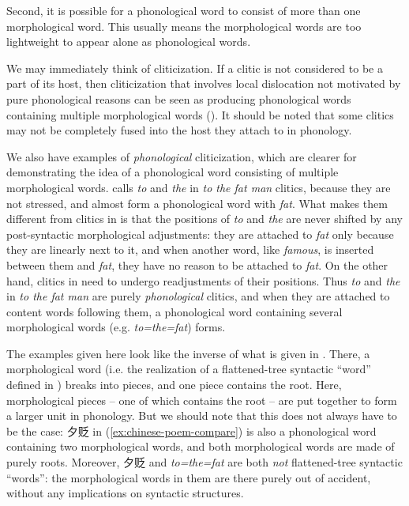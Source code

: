 \documentclass[a4paper, oneside, scheme=plain, 12pt]{article}
\newcommand*{\citepage}[1]{p.~{#1}}
\newcommand{\form}[1]{\emph{#1}}
\begin{document}
Second, it is possible for a phonological word to consist of more than one morphological word.
This usually means the morphological words are too lightweight
to appear alone as phonological words.

We may immediately think of cliticization.
If a clitic is not considered to be a part of its host,
then cliticization that involves local dislocation not motivated by pure phonological reasons
can be seen as producing phonological words containing multiple morphological words
().
It should be noted that some clitics may not be completely fused into the host they attach to in phonology.

We also have examples of \emph{phonological} cliticization,
which are clearer for demonstrating the idea of a phonological word consisting of multiple morphological words.
\citet[\citepage{49}]{dixon2009basic1} calls \form{to} and \form{the} in \form{to the fat man} clitics,
because they are not stressed, and almost form a phonological word with \form{fat}.
What makes them different from clitics in 
is that the positions of \form{to} and \form{the} are never shifted by any post-syntactic morphological adjustments:
they are attached to \form{fat} only because they are linearly next to it,
and when another word, like \form{famous}, is inserted between them and \form{fat},
they have no reason to be attached to \form{fat}.
On the other hand, clitics in  need to undergo readjustments of their positions.
Thus \form{to} and \form{the} in \form{to the fat man} are purely \emph{phonological} clitics,
and when they are attached to content words following them,
a phonological word containing several morphological words (e.g. \form{to=the=fat}) forms.

The examples given here look like the inverse of what is given in .
There, a morphological word (i.e. the realization of a flattened-tree syntactic ``word'' defined in ) breaks into pieces,
and one piece contains the root.
Here, morphological pieces -- one of which contains the root -- are put together to form a larger unit in phonology.
But we should note that this does not always have to be the case:
夕贬 in (\ref{ex:chinese-poem-compare}) is also a phonological word containing two morphological words,
and both morphological words are made of purely roots.
Moreover, 夕贬 and \form{to=the=fat} are both \emph{not} flattened-tree syntactic ``words'':
the morphological words in them are there purely out of accident,
without any implications on syntactic structures.
\end{document}
